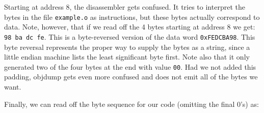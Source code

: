 \documentclass[11pt]{article}
\newenvironment{tty}%
{\small\begin{alltt}}%
{\end{alltt}}
\begin{document}
Starting at address 8, the disassembler gets confused.  It tries to
interpret the bytes in the file {\tt example.o} as instructions, but
these bytes actually correspond to data.  Note, however, that if we
read off the 4 bytes starting at address 8 we get: {\tt 98 ba dc fe}.
This is a byte-reversed version of the data word {\tt 0xFEDCBA98}.
This byte reversal represents the proper way to supply the bytes as a
string, since a little endian machine lists the least significant byte
first.  Note also that it only generated two of the four bytes at the end with
value {\tt 00}.  Had we not added this padding, {\sc objdump} gets
even more confused and does not emit all of the bytes we want.

Finally, we can read off the byte sequence for our code (omitting the
final 0's) as:
\begin{tty}

\end{tty}
\end{document}
